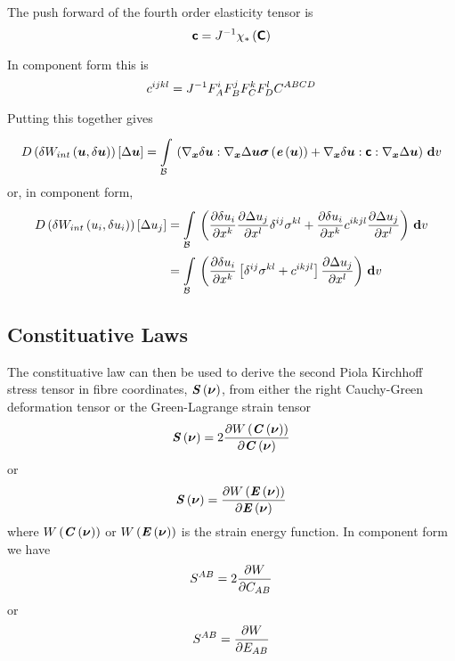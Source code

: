 The push forward of the fourth order elasticity tensor is
\begin{equation}
  \boldsymbol{\mathsf{c}}={J}^{-1} \chi_{*}\left( \boldsymbol{\mathsf{C}} \right) 
\end{equation}

In component form this is
\begin{equation}
  c^{ijkl}={J}^{-1}F^{i}_{A}F^{j}_{B}F^{k}_{C}F^{l}_{D}C^{ABCD}
\end{equation}

Putting this together gives
\begin{equation}
  \directionalderiv{\delta\fnof{W_{int}}{\vectr{u},\delta\vectr{u}}}{\Delta\vectr{u}}=
  \gint{\embedmanifold{B}}{}{\pbrac{\doubledotprod{\gradient{\vectr{x}}{\delta\vectr{u}}}{\gradient{\vectr{x}}{\Delta\vectr{u}}\fnof{\tensor{\sigma}}{\fnof{\tensor{e}}{\vectr{u}}}}+
      \doubledotprod{\gradient{\vectr{x}}{\delta\vectr{u}}}{\doubledotprod{\tensorfour{c}}{\gradient{\vectr{x}}{\Delta\vectr{u}}}}}}{v}
\end{equation}
or, in component form,
\begin{equation}
  \begin{split}
       D\left( \delta W_{int}\left( u_{i},\delta u_{i} \right)  \right) \left[ \Delta u_{j} \right]  &=
      \displaystyle\int\limits_{ \mathcal{B} }^{} \,\left(  \dfrac{\partial \delta u_{i}}{\partial x^{k}}  \dfrac{\partial \Delta
          u_{j}}{\partial x^{l}}  \delta^{{i}{j}} \sigma^{kl}+
         \dfrac{\partial \delta u_{i}}{\partial x^{k}} c^{ikjl} \dfrac{\partial \Delta u_{j}}{\partial x^{l}}  \right)\, \boldsymbol{\mathrm{d}}  v \\
    &=  \displaystyle\int\limits_{ \mathcal{B} }^{} \,\left(  \dfrac{\partial \delta
          u_{i}}{\partial x^{k}} \left[  \delta^{{i}{j}} \sigma^{kl}+c^{ikjl} \right] \dfrac{\partial \Delta u_{j}}{\partial x^{l}}  \right)\, \boldsymbol{\mathrm{d}}  v 
  \end{split}
\end{equation}

\subsection{Constituative Laws}

The constituative law can then be used to derive the second Piola Kirchhoff
stress tensor in fibre coordinates, $ \boldsymbol{\mathit{S}}\left( \boldsymbol{\nu} \right) $, from
either the right Cauchy-Green deformation tensor or the Green-Lagrange strain
tensor \ie
\begin{equation}
   \boldsymbol{\mathit{S}}\left( \boldsymbol{\nu} \right) =2 \dfrac{\partial  W\left(  \boldsymbol{\mathit{C}}\left( \boldsymbol{\nu} \right)  \right) }{\partial  \boldsymbol{\mathit{C}}\left( \boldsymbol{\nu} \right) } 
\end{equation}
or
\begin{equation}
   \boldsymbol{\mathit{S}}\left( \boldsymbol{\nu} \right) = \dfrac{\partial  W\left(  \boldsymbol{\mathit{E}}\left( \boldsymbol{\nu} \right)  \right) }{\partial  \boldsymbol{\mathit{E}}\left( \boldsymbol{\nu} \right) } 
\end{equation}
where $ W\left(  \boldsymbol{\mathit{C}}\left( \boldsymbol{\nu} \right)  \right) $ or
$ W\left(  \boldsymbol{\mathit{E}}\left( \boldsymbol{\nu} \right)  \right) $ is the strain energy
function. In component form we have
\begin{equation}
  S^{AB}=2 \dfrac{\partial W}{\partial C_{AB}} 
\end{equation}
or
\begin{equation}
  S^{AB}= \dfrac{\partial W}{\partial E_{AB}} 
\end{equation}

